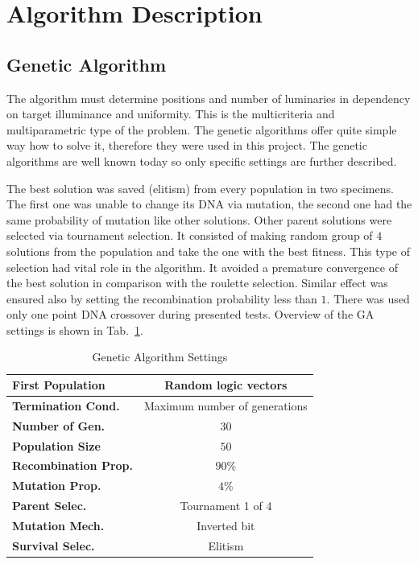 \section{Algorithm Description}
\subsection{Genetic Algorithm}
\label{ssec:GenAlg}
The algorithm must determine positions and number of luminaries in dependency on target illuminance and uniformity. This is the multicriteria and multiparametric type of the problem. The genetic algorithms offer quite simple way how to solve it, therefore they were used in this project. The genetic algorithms are well known today so only specific settings are further described.

The best solution was saved (elitism) from every population in two specimens. The first one was unable to change its DNA via mutation, the second one had the same probability of mutation like other solutions. Other parent solutions were selected via tournament selection. It consisted of making random group of $4$ solutions from the population and take the one with the best fitness. This type of selection had vital role in the algorithm. It avoided a premature convergence of the best solution in comparison with the roulette selection. Similar effect was ensured also by setting the recombination probability less than $1$. There was used only one point DNA crossover during presented tests. Overview of the GA settings is shown in Tab.~\ref{tab:GAsettings}.

\begin{table}[htb]
	\renewcommand{\arraystretch}{1.3}
	\caption{Genetic Algorithm Settings}
 	\label{tab:GAsettings}
	\centering
  \begin{tabular}{| l | c |}
    \hline
    \textbf{First Population} & Random logic vectors \\
    \hline
    \textbf{Termination Cond.} & Maximum number of generations \\
    \hline
		\textbf{Number of Gen.} & $30$ \\
    \hline
		\textbf{Population Size} & $50$ \\
    \hline
		\textbf{Recombination Prop.} & $90 \%$ \\
    \hline
		\textbf{Mutation Prop.} & $4 \%$ \\
    \hline
		\textbf{Parent Selec.} & Tournament 1 of 4 \\
    \hline
		\textbf{Mutation Mech.} & Inverted bit \\
    \hline
		\textbf{Survival Selec.} & Elitism \\
    \hline
  \end{tabular}
\end{table}

